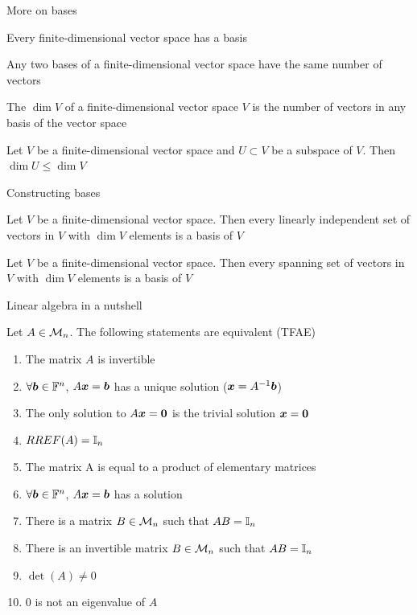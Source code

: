 \documentclass[aspectratio=169]{beamer}\usepackage[]{graphicx}\usepackage[]{xcolor}
\begin{document}
\begin{frame}{More on bases}
	\begin{theorem}
	Every finite-dimensional vector space has a basis
	\end{theorem}
	\vfill
	\begin{importanttheorem}
		Any two bases of a finite-dimensional vector space have the same number of vectors
	\end{importanttheorem}
	\vfill
	\begin{definition}[Dimension]
		The  $\dim V$ of a finite-dimensional vector space $V$ is the number of vectors in any basis of the vector space
	\end{definition}
	\vfill
	\begin{theorem}
		Let $V$ be a finite-dimensional vector space and $U\subset V$ be a subspace of $V$. Then $\dim U\leq \dim V$
	\end{theorem}
\end{frame}


\begin{frame}{Constructing bases}
	\begin{theorem}
		Let $V$ be a finite-dimensional vector space. Then every linearly independent set of vectors in $V$ with $\dim V$ elements is a basis of $V$
	\end{theorem}
	\vfill
	\begin{theorem}
		Let $V$ be a finite-dimensional vector space. Then every spanning set of vectors in $V$ with $\dim V$ elements is a basis of $V$
	\end{theorem}
\end{frame}



\begin{frame}{Linear algebra in a nutshell}
\begin{importanttheorem}
\label{th:L04-linalg-in-a-nutshell}
Let $A\in\mathcal{M}_n$. The following statements are equivalent (TFAE)
\begin{enumerate}
\item The matrix $A$ is invertible
\item $\forall\bm{b}\in\mathbb{F}^n$, $A\bm{x} = \bm{b}$ has a unique solution ($\bm{x}=A^{-1}\bm{b}$)
\item The only solution to $A\bx = \b0$ is the trivial solution $\bx = \b0$
\item $RREF(A)=\mathbb{I}_n$
\item The matrix A is equal to a product of elementary matrices
\item $\forall\bm{b}\in\mathbb{F}^n$, $A\bm{x} = \bm{b}$ has a solution
\item There is a matrix $B\in\mathcal{M}_n$ such that $AB = \mathbb{I}_n$
\item There is an invertible matrix $B\in\mathcal{M}_n$ such that $AB = \mathbb{I}_n$
\item $\det(A)\neq 0$
\item $0$ is not an eigenvalue of $A$
\end{enumerate}
\end{importanttheorem}
\end{frame}
\end{document}
